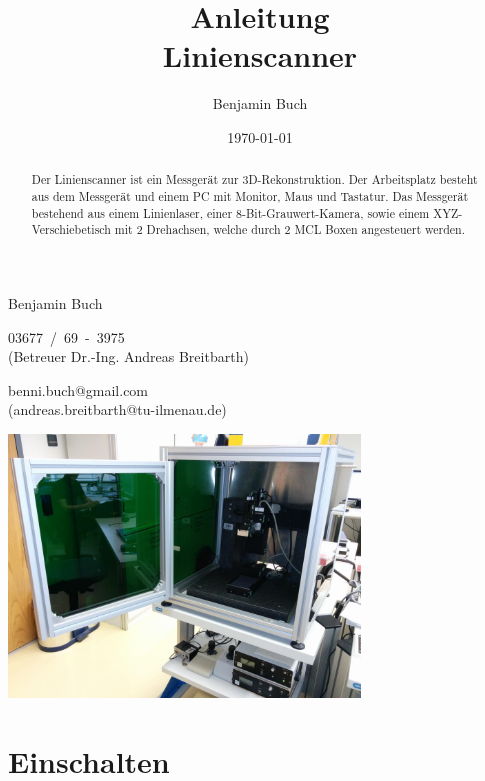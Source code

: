 \documentclass[a4paper,10pt]{scrartcl}
\title{Anleitung\\Linienscanner}
\author{\Large Benjamin Buch}
\date{\large \today}
\begin{document}
\maketitle

\begin{center}
\begin{minipage}{0.6\textwidth}
\begin{description}
  \large
  \item[Autor $\ \ $] Benjamin Buch
  \item[Telefon] 03677~/~69~-~3975\\(Betreuer Dr.-Ing. Andreas Breitbarth)
  \item[E-Mail] benni.buch@gmail.com\\(andreas.breitbarth@tu-ilmenau.de)
\end{description}
\end{minipage}
\end{center}

\bigskip

\begin{abstract}
Der Linienscanner ist ein Messgerät zur 3D-Rekonstruktion. Der Arbeitsplatz
besteht aus dem Messgerät und einem PC mit Monitor, Maus und Tastatur. Das
Messgerät bestehend aus einem Linienlaser, einer 8-Bit-Grauwert-Kamera, sowie
einem XYZ-Verschiebetisch mit 2 Drehachsen, welche durch 2 MCL Boxen angesteuert
werden.
\end{abstract}

\bigskip

\begin{center}
\includegraphics[width=0.7\textwidth]{include/IMG_20160412_140245.jpg}
\end{center}

\section{Einschalten}
\end{document}
